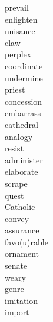 \documentclass[b5paper, 11pt]{ctexart}
\begin{document}
\begin{multicols*}{3}
\begin{description}
\item[prevail]

\item[enlighten]

\item[nuisance]

\item[claw]

\item[perplex]

\item[coordinate]

\item[undermine]

\item[priest]

\item[concession]

\item[embarrass]

\item[cathedral]

\item[analogy]

\item[resist]

\item[administer]

\item[elaborate]

\item[scrape]

\item[quest]

\item[Catholic]

\item[convey]

\item[assurance]

\item[favo(u)rable]

\item[ornament]

\item[senate]

\item[weary]

\item[genre]

\item[imitation]

\item[import]


\end{description}
\end{multicols*}
\end{document}

